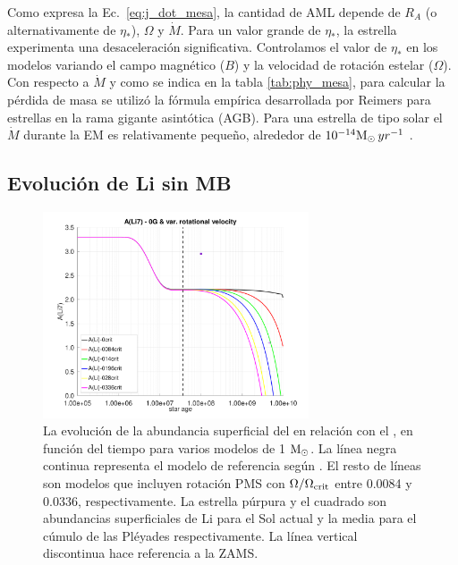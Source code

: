 Como expresa la Ec.~\ref{eq:j_dot_mesa}, la cantidad de AML depende de $R_A$ (o alternativamente de $\eta_*$), $\Omega$ y $\Dot{M}$. Para un valor grande de $\eta_*$, la estrella experimenta una desaceleración significativa. Controlamos el valor de $\eta_*$ en los modelos variando el campo magnético ($B$) y la velocidad de rotación estelar ($\Omega$). Con respecto a $\Dot{M}$ y como se indica en la tabla \ref{tab:phy_mesa}, para calcular la pérdida de masa se utilizó la fórmula empírica desarrollada por Reimers \cite{Reimers1975} para estrellas en la rama gigante asintótica (AGB). Para una estrella de tipo solar el $\Dot{M}$ durante la EM es relativamente pequeño, alrededor de $10^{-14}\mathrm{M}_\odot \, yr^{-1}$ \cite{Noerdlinger2008}. \par

\subsection{Evolución de Li sin MB}

\begin{figure}
    \centering
	\includegraphics[width=0.7\textwidth]{img/paper1/li_var_vel_0_0g.pdf}
	\caption{La evolución de la abundancia superficial del  en relación con el , en función del tiempo para varios modelos de 1 $\mathrm{M}_\odot$. La línea negra continua representa el modelo de referencia según \cite{Choi2016}. El resto de líneas son modelos que incluyen rotación PMS con $\Omega / \Omega_{\mathrm{crit}}$ entre 0.0084 y 0.0336, respectivamente. La estrella púrpura y el cuadrado son abundancias superficiales de Li para el Sol actual \cite{Asplund2009} y la media para el cúmulo de las Pléyades \cite{Sestito2005} respectivamente. La línea vertical discontinua hace referencia a la ZAMS.}
	\label{fig:li_var_vel_0g}
\end{figure}


